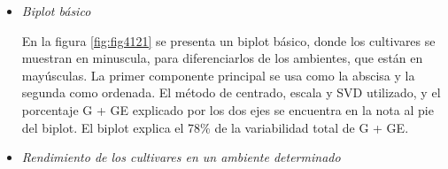 \begin{itemize}[wide, nosep, labelindent = 0pt,  noitemsep, topsep=0pt]
\item \emph{Biplot básico}

En la figura \ref{fig:fig4121} se presenta un biplot básico, donde los cultivares se muestran en minuscula, para diferenciarlos de los ambientes, que están en mayúsculas. La primer componente principal se usa como la abscisa y la segunda como ordenada. El método de centrado, escala y SVD utilizado, y el porcentaje G + GE explicado por los dos ejes se encuentra en la nota al pie del biplot. El biplot explica el 78\% de la variabilidad total de G + GE.
\item \emph{Rendimiento de los cultivares en un ambiente determinado}


\end{itemize}
